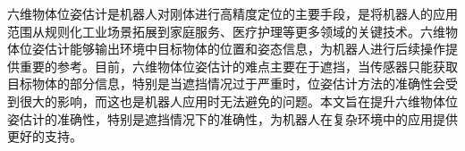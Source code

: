 \cleardoublepage
{}
\par 六维物体位姿估计是机器人对刚体进行高精度定位的主要手段，是将机器人的应用范围从规则化工业场景拓展到家庭服务、医疗护理等更多领域的关键技术。六维物体位姿估计能够输出环境中目标物体的位置和姿态信息，为机器人进行后续操作提供重要的参考。目前，六维物体位姿估计的难点主要在于遮挡，当传感器只能获取目标物体的部分信息，特别是当遮挡情况过于严重时，位姿估计方法的准确性会受到很大的影响，而这也是机器人应用时无法避免的问题。本文旨在提升六维物体位姿估计的准确性，特别是遮挡情况下的准确性，为机器人在复杂环境中的应用提供更好的支持。
\cleardoublepage
{}